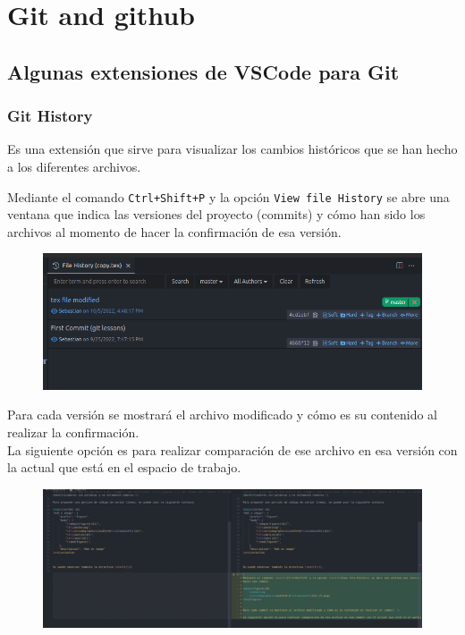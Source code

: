 \chapter{Git and github}



\section{Algunas extensiones de VSCode para Git}


\subsection{Git History}

Es una extensión que sirve para visualizar los cambios históricos que se han hecho a los diferentes archivos.

Mediante el comando \texttt{Ctrl+Shift+P} y la opción \texttt{View file History} se abre una ventana que indica las versiones del proyecto (commits) y cómo han sido los archivos al momento de hacer la confirmación de esa versión.

\begin{figure}[H]
    \centering
    \includegraphics[width=0.6\columnwidth]{Github/Git_f1.png}
\end{figure}


Para cada versión se mostrará el archivo modificado y cómo es su contenido al realizar la confirmación. \\

La siguiente opción es para realizar comparación de ese archivo en esa versión con la actual que está en el espacio de trabajo.

\begin{figure}[H]
    \centering
    \includegraphics[width=0.6\columnwidth]{Github/Git_f2.png}
\end{figure}

